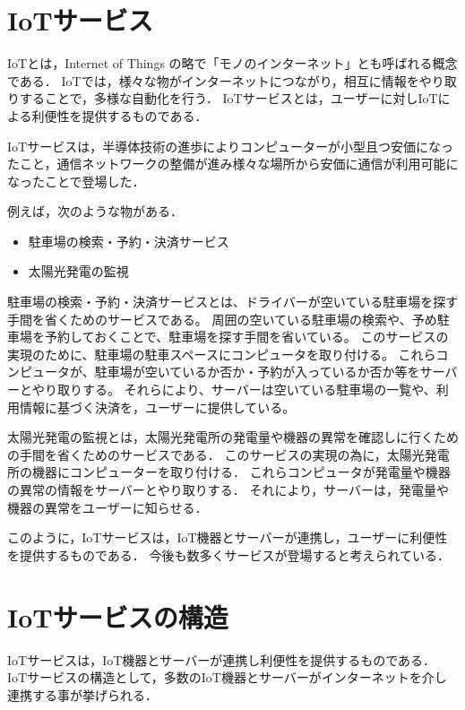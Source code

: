 \section{IoTサービス}
IoTとは，Internet of Things の略で「モノのインターネット」とも呼ばれる概念である．
IoTでは，様々な物がインターネットにつながり，相互に情報をやり取りすることで，多様な自動化を行う．
IoTサービスとは，ユーザーに対しIoTによる利便性を提供するものである．
\medskip

IoTサービスは，半導体技術の進歩によりコンピューターが小型且つ安価になったこと，通信ネットワークの整備が進み様々な場所から安価に通信が利用可能になったことで登場した．
\medskip

例えば，次のような物がある．
\begin{itemize}
	\item 駐車場の検索・予約・決済サービス\cite{エコパ}
	\item 太陽光発電の監視
\end{itemize}

駐車場の検索・予約・決済サービスとは、ドライバーが空いている駐車場を探す手間を省くためのサービスである。
周囲の空いている駐車場の検索や、予め駐車場を予約しておくことで、駐車場を探す手間を省いている。
このサービスの実現のために、駐車場の駐車スペースにコンピュータを取り付ける。
これらコンピュータが、駐車場が空いているか否か・予約が入っているか否か等をサーバーとやり取りする。
それらにより、サーバーは空いている駐車場の一覧や、利用情報に基づく決済を，ユーザーに提供している。
\medskip

太陽光発電の監視とは，太陽光発電所の発電量や機器の異常を確認しに行くための手間を省くためのサービスである．
このサービスの実現の為に，太陽光発電所の機器にコンピューターを取り付ける．
これらコンピュータが発電量や機器の異常の情報をサーバーとやり取りする．
それにより，サーバーは，発電量や機器の異常をユーザーに知らせる．
\medskip

このように，IoTサービスは，IoT機器とサーバーが連携し，ユーザーに利便性を提供するものである．
今後も数多くサービスが登場すると考えられている．

\section{IoTサービスの構造}
IoTサービスは，IoT機器とサーバーが連携し利便性を提供するものである．
IoTサービスの構造として，多数のIoT機器とサーバーがインターネットを介し連携する事が挙げられる．
\medskip

